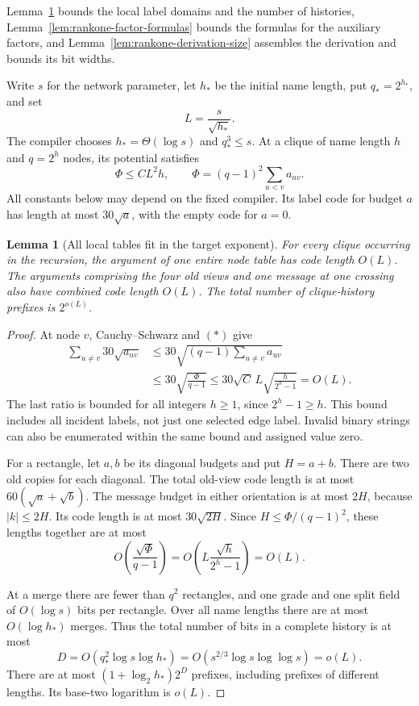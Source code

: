 \documentclass[11pt]{article}
\newtheorem{lemma}[theorem]{Lemma}
\theoremstyle{definition}
\theoremstyle{remark}
\begin{document}
Lemma~\ref{lem:rankone-local-domains} bounds the local label domains
and the number of histories,
Lemma~\ref{lem:rankone-factor-formulas} bounds the formulas for the
auxiliary factors, and Lemma~\ref{lem:rankone-derivation-size}
assembles the derivation and bounds its bit widths.

Write $s$ for the network parameter, let $h_*$ be the initial
name length, put $q_*=2^{h_*}$, and set
\[
 L=\frac{s}{\sqrt{h_*}}.
\]
The compiler chooses $h_*=\Theta(\log s)$ and $q_*^3\le s$.
At a clique of name length $h$ and $q=2^h$ nodes, its potential
satisfies
\[
 \Phi\le C L^2h,
 \qquad
 \Phi=(q-1)^2\sum_{u<v}a_{uv}.
 \tag{\(*\)}
\]
All constants below may depend on the fixed compiler. Its label
code for budget $a$ has length at most $30\sqrt a$, with the
empty code for $a=0$.

\begin{lemma}[All local tables fit in the target exponent]
\label{lem:rankone-local-domains}
For every clique occurring in the recursion, the argument of one
entire node table has code length $O(L)$. The arguments comprising
the four old views and one message at one crossing also have
combined code length $O(L)$. The total number of clique-history
prefixes is $2^{o(L)}$.
\end{lemma}
\begin{proof}
At node $v$, Cauchy--Schwarz and $(*)$ give
\begin{align*}
 \sum_{u\ne v}30\sqrt{a_{uv}}
 &\le30\sqrt{(q-1)\sum_{u\ne v}a_{uv}}\\
 &\le30\sqrt{\frac{\Phi}{q-1}}
 \le30\sqrt C\,L\sqrt{\frac{h}{2^h-1}}=O(L).
\end{align*}
The last ratio is bounded for all integers $h\ge1$, since
$2^h-1\ge h$. This bound includes all incident labels, not just
one selected edge label. Invalid binary strings can also be
enumerated within the same bound and assigned value zero.

For a rectangle, let $a,b$ be its diagonal budgets and put
$H=a+b$. There are two old copies for each diagonal. The total
old-view code length is at most $60(\sqrt a+\sqrt b)$.
The message budget in either orientation is at most $2H$,
because $|k|\le2H$. Its code length is at most
$30\sqrt{2H}$. Since
$H\le\Phi/(q-1)^2$, these lengths together are at most
\[
 O\!\left(\frac{\sqrt\Phi}{q-1}\right)
 =O\!\left(L\frac{\sqrt h}{2^h-1}\right)=O(L).
\]

At a merge there are fewer than $q^2$ rectangles, and one
grade and one split field of $O(\log s)$ bits per rectangle.
Over all name lengths there are at most $O(\log h_*)$ merges.
Thus the total number of bits in a complete history is at most
\[
 D=O(q_*^2\log s\log h_*)
   =O(s^{2/3}\log s\log\log s)=o(L).
\]
There are at most $(1+\log_2h_*)2^D$ prefixes, including
prefixes of different lengths. Its base-two logarithm is $o(L)$.
\end{proof}
\end{document}
